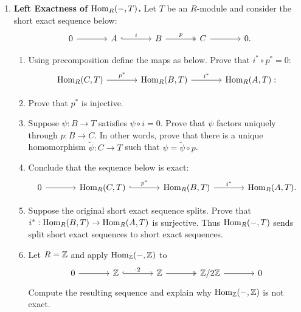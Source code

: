 \documentclass[Notebook.tex]{subfiles}
\begin{document}
\begin{enumerate}[leftmargin=*, resume=problems]



\item \textbf{Left Exactness of $\operatorname{Hom}_R(-,T)$.} Let $T$ be an $R$-module and consider the short exact sequence below:
\[
\begin{tikzcd}[column sep=large]
0 \arrow[r] & A \arrow[r, hook, "i"] & B \arrow[r, two heads, "p"] & C \arrow[r] & 0.
\end{tikzcd}
\]
\begin{enumerate}
\item Using precomposition define the maps as below. Prove that $i^*\circ p^*=0$:
\[
\begin{tikzcd}[column sep=large]
\Hom_R(C,T) \arrow[r, "p^*"] & \Hom_R(B,T) \arrow[r, "i^*"] & \Hom_R(A,T):
\end{tikzcd}
\]
\item Prove that $p^*$ is injective.
\item Suppose $\psi:B\to T$ satisfies $\psi\circ i=0$. Prove that $\psi$ factors uniquely through $p:B\to C$. In other words, prove that there is a unique homomorphism $\widetilde{\psi}:C\to T$ such that $\psi=\widetilde{\psi}\circ p$.
\item Conclude that the sequence below is exact:
\[
\begin{tikzcd}[column sep=large]
0 \arrow[r] & \Hom_R(C,T) \arrow[r, hook, "p^*"] & \Hom_R(B,T) \arrow[r, "i^*"] & \Hom_R(A,T).
\end{tikzcd}
\]
\item Suppose the original short exact sequence splits. Prove that $i^*:\operatorname{Hom}_R(B,T)\to \operatorname{Hom}_R(A,T)$ is surjective. Thus $\operatorname{Hom}_R(-,T)$ sends split short exact sequences to short exact sequences.
\item Let $R=\mathbb Z$ and apply $\operatorname{Hom}_{\mathbb Z}(-,\mathbb Z)$ to
\[
\begin{tikzcd}[column sep=large]
0 \arrow[r] & \Z \arrow[r, hook, "\cdot 2"] & \Z \arrow[r, two heads] & \Z/2\Z \arrow[r] & 0
\end{tikzcd}
\]
Compute the resulting sequence and explain why $\operatorname{Hom}_{\mathbb Z}(-,\mathbb Z)$ is not exact.
\end{enumerate}


\end{enumerate}
\end{document}

